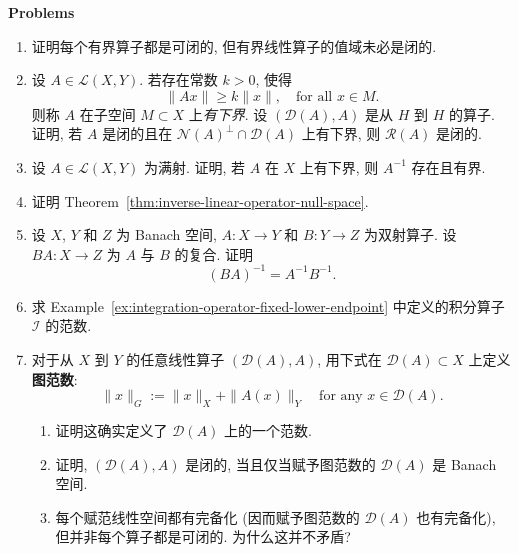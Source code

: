 \textbf{Problems}

\begin{enumerate}[label=\thesection.\arabic*.,ref=\thesection.\arabic*,start=1,series=book-problems]

\item\label{ex:bounded-operator-closable-nonclosed-range} 证明每个有界算子都是可闭的, 但有界线性算子的值域未必是闭的.

\item\label{ex:closed-bounded-below-operator-closed-range} 设 $A\in\mathcal{L}(X,Y)$. 若存在常数 $k>0$, 使得\[\|Ax\|\geq k\|x\|,\quad\text{for all }x\in M.\]则称 $A$ 在子空间 $M\subset X$ 上\emph{有下界}. 设 $(\mathcal{D}(A),A)$ 是从 $H$ 到 $H$ 的算子. 证明, 若 $A$ 是闭的且在 $\mathcal{N}(A)^\perp\cap\mathcal{D}(A)$ 上有下界, 则 $\mathcal{R}(A)$ 是闭的.

\item\label{ex:surjective-bounded-below-inverse} 设 $A\in\mathcal{L}(X,Y)$ 为满射. 证明, 若 $A$ 在 $X$ 上有下界, 则 $A^{-1}$ 存在且有界.

\item\label{ex:inverse-linear-operator-null-space-criterion} 证明 Theorem~\ref{thm:inverse-linear-operator-null-space}.

\item\label{ex:composition-bijective-operators-inverse} 设 $X$, $Y$ 和 $Z$ 为 Banach 空间, $A:X\to Y$ 和 $B:Y\to Z$ 为双射算子. 设 $BA:X\to Z$ 为 $A$ 与 $B$ 的复合. 证明\[(BA)^{-1}=A^{-1}B^{-1}.\]

\item\label{ex:integration-operator-supremum-norm} 求 Example~\ref{ex:integration-operator-fixed-lower-endpoint} 中定义的积分算子 $\mathcal{I}$ 的范数.

\item\label{ex:operator-graph-norm-completeness} 对于从 $X$ 到 $Y$ 的任意线性算子 $(\mathcal{D}(A),A)$, 用下式在 $\mathcal{D}(A)\subset X$ 上定义\textbf{图范数}:\[\|x\|_G:=\|x\|_X+\|A(x)\|_Y\quad\text{for any }x\in\mathcal{D}(A).\]\begin{enumerate}[label=(\alph*)]\item 证明这确实定义了 $\mathcal{D}(A)$ 上的一个范数.\item 证明, $(\mathcal{D}(A),A)$ 是闭的, 当且仅当赋予图范数的 $\mathcal{D}(A)$ 是 Banach 空间.\item 每个赋范线性空间都有完备化 (因而赋予图范数的 $\mathcal{D}(A)$ 也有完备化), 但并非每个算子都是可闭的. 为什么这并不矛盾?\end{enumerate}


\end{enumerate}

